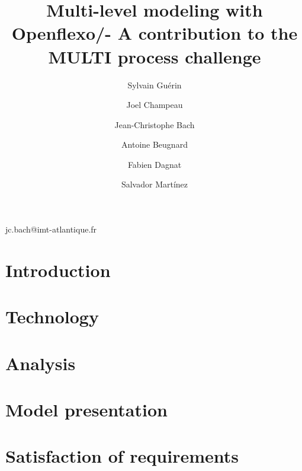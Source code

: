 \documentclass[american]{emisa}
\newcommand{\noteSM}[1]{\todo[color=red!40, author=\textbf{Salvador}, inline, caption={}]{#1}}
\newcommand{\noteJC}[1]{\todo[color=pink!40, author=\textbf{JC}, inline, caption={}]{#1}}
\newcommand{\noteSylvain}[1]{\todo[color=green!40, author=\textbf{Sylvain}, inline, caption={}]{#1}}
\newcommand{\noteAntoine}[1]{\todo[color=yellow!40, author=\textbf{Antoine}, inline, caption={}]{#1}}
\newcommand{\noteFabien}[1]{\todo[color=orange!40, author=\textbf{Fabien}, inline, caption={}]{#1}}
\newcommand{\noteJoel}[1]{\todo[color=blue!20, author=\textbf{Joel}, inline, caption={}]{#1}}
\newcommand{\mpc}{MULTI process challenge\xspace}
\begin{document}
\begin{article}{
    \title{Multi-level modeling with Openflexo/\FML - A contribution to the \mpc}

    \author{Sylvain Guérin}%
    \address{ENSTA Bretagne, Lab-STICC, UMR 6285, Brest, France}

    \author{Joel Champeau}
    \address[a]{}

    \author*{Jean-Christophe Bach}{jc.bach@imt-atlantique.fr}
    \address{IMT Atlantique, Lab-STICC, UMR 6285, Brest, France}

    \author{Antoine Beugnard}
    \address[b]{}

    \author{Fabien Dagnat}
    \address[b]{}

    \author{Salvador Mart\'inez}
    \address[b]{}

    \abstract{}
    
}

\section{Introduction}
\label{sec:introduction}



\section{Technology}
\label{sec:technology}


\section{Analysis}
\label{sec:analysis}


\section{Model presentation}
\label{sec:model}


\section{Satisfaction of requirements}
\label{sec:requirements}



\end{article}
\end{document}
